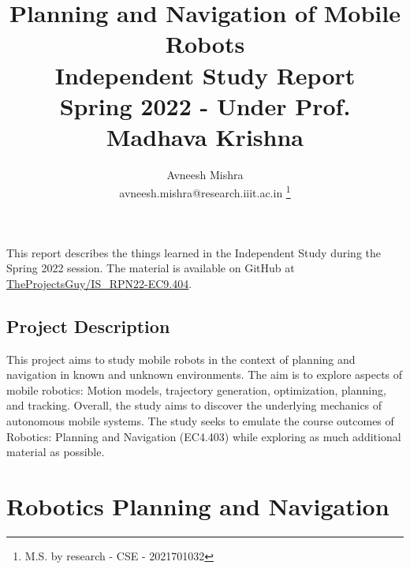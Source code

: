 


{
   \fancyhf{}
   \renewcommand{\headrulewidth}{0pt} %
}

\title{Planning and Navigation of Mobile Robots \\
    \Large Independent Study Report \\
    \small Spring 2022 - Under Prof. Madhava Krishna
}

\author{Avneesh Mishra \\
    avneesh.mishra@research.iiit.ac.in
    \thanks{M.S. by research - CSE - 2021701032}}


    \maketitle
    \thispagestyle{fancy_tr_rno}
    
    This report describes the things learned in the Independent Study during the Spring 2022 session. The material is available on GitHub at \href{https://github.com/TheProjectsGuy/IS_RPN22-EC9.404}{TheProjectsGuy/IS\_RPN22-EC9.404}.

    \subsection*{Project Description}
    This project aims to study mobile robots in the context of planning and navigation in known and unknown environments. The aim is to explore aspects of mobile robotics: Motion models, trajectory generation, optimization, planning, and tracking. Overall, the study aims to discover the underlying mechanics of autonomous mobile systems. The study seeks to emulate the course outcomes of Robotics: Planning and Navigation (EC4.403) while exploring as much additional material as possible.

    \tableofcontents

    \pagebreak
    
    \pagebreak
    
    \pagebreak
    \section{Robotics Planning and Navigation}
    \label{sec:rpn-assignments}
    
    \pagebreak
    
    \pagebreak
    

    \printbibliography


